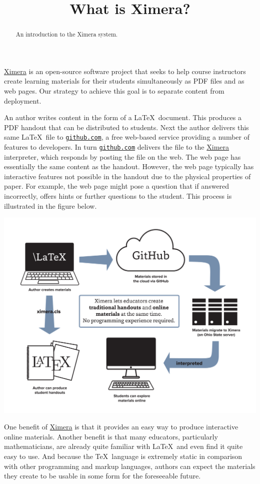 \documentclass{ximera}
\title{What is Ximera?}
\begin{document}
\begin{abstract}
An introduction to the Ximera system.
\end{abstract}
\maketitle

\href{http://ximera.osu.edu}{\sf Ximera}
is an open-source software project that
seeks to help course instructors create learning materials
for their students simultaneously as PDF files and as web pages.
Our strategy to achieve this goal is to separate
content from deployment.

An author writes content in the form of a \LaTeX\ document.
This produces a PDF handout that can be distributed to students.
Next the author delivers this same \LaTeX\ file to
\href{http://github.com}{\tt github.com},
a free web-based service providing a number of features to developers.
In turn \href{http://github.com}{\tt github.com} delivers
the file to the \href{http://ximera.osu.edu}{\sf Ximera}
interpreter, which responds by posting the file on the web.
The web page has essentially the same content as the handout.
However, the web page typically has interactive features
not possible in the handout due to the physical properties of paper.
For example, the web page might pose a question
that if answered incorrectly, offers hints or further questions
to the student.
This process is illustrated in the figure below.

\begin{image}
\includegraphics[scale=.25]{XimeraGraphic.png}
\end{image}

One benefit of \href{http://ximera.osu.edu}{\sf Ximera}
is that it provides an easy way to produce interactive online materials.
Another benefit is that many educators, particularly mathematicians,
are already quite familiar with \LaTeX\ and
even find it quite easy to use.
And because the \TeX\ language is extremely static in comparison with
other programming and markup languages, authors can expect
the materials they create to be usable in some
form for the foreseeable future.
\end{document}
